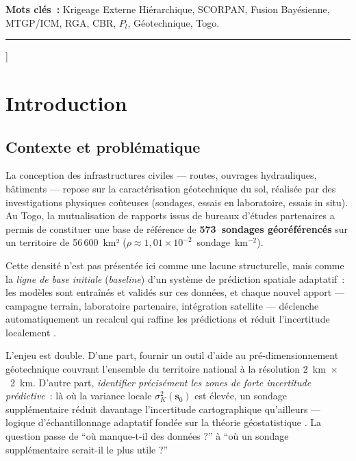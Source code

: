 \documentclass[10pt,a4paper,twocolumn]{article}
\newcommand{\bs}{\mathbf{s}}
\begin{document}
	\smallskip
	\noindent\small
	\textbf{Mots clés~:} Krigeage Externe Hiérarchique, SCORPAN,
	Fusion Bayésienne, MTGP/ICM, RGA, CBR, $P_l$, Géotechnique, Togo.
	
	\vspace{0.15cm}
	\rule{\linewidth}{0.4pt}
	\vspace{0.3cm}
	]
	
	\section{Introduction}
	\label{sec:intro}
	
	\subsection{Contexte et problématique}
	\label{subsec:contexte}
	
	La conception des infrastructures civiles --- routes, ouvrages hydrauliques,
	bâtiments --- repose sur la caractérisation géotechnique du sol, réalisée
	par des investigations physiques coûteuses (sondages, essais en laboratoire,
	essais in situ). Au Togo, la mutualisation de rapports issus de bureaux
	d'études partenaires a permis de constituer une base de référence de
	\textbf{573~sondages géoréférencés} sur un territoire de
	56\,600~km² ($\rho \approx 1{,}01\times10^{-2}$~sondage~km$^{-2}$).
	
	Cette densité n'est pas présentée ici comme une lacune structurelle, mais
	comme la \emph{ligne de base initiale} (\textit{baseline}) d'un système
	de prédiction spatiale adaptatif~: les modèles sont entraînés et validés
	sur ces données, et chaque nouvel apport --- campagne terrain, laboratoire
	partenaire, intégration satellite --- déclenche automatiquement un recalcul
	qui raffine les prédictions et réduit l'incertitude localement
	\cite{mcbratney2003digital,brus2007sampling}.
	
	L'enjeu est double. D'une part, fournir un outil d'aide au
	pré-dimensionnement géotechnique couvrant l'ensemble du territoire national
	à la résolution 2~km~$\times$~2~km. D'autre part, \emph{identifier
		précisément les zones de forte incertitude prédictive}~: là où la variance
	locale $\sigma^2_K(\bs_0)$ est élevée, un sondage supplémentaire réduit
	davantage l'incertitude cartographique qu'ailleurs --- logique
	d'échantillonnage adaptatif fondée sur la théorie géostatistique
	\cite{brus2007sampling}. La question passe de
	``où manque-t-il des données ?'' à
	``où un sondage supplémentaire serait-il le plus utile ?''
	
\end{document}
